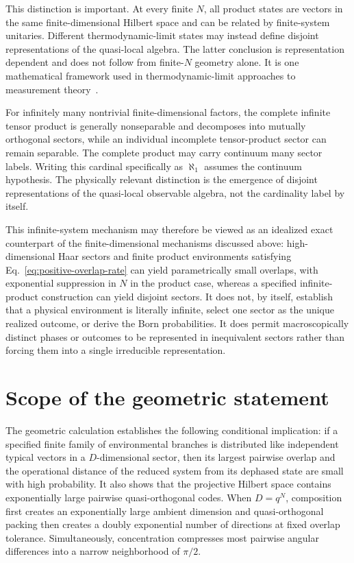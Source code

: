 \documentclass[aps,pra,reprint,superscriptaddress,nofootinbib,longbibliography]{revtex4-2}
\begin{document}
This distinction is important.  At every finite $N$, all product states are
vectors in the same finite-dimensional Hilbert space and can be related by
finite-system unitaries.  Different thermodynamic-limit states may instead
define disjoint representations of the quasi-local algebra.
The latter conclusion is representation dependent and does not follow from
finite-$N$ geometry alone.  It is one mathematical framework used in
thermodynamic-limit approaches to measurement
theory~\cite{hepp-1972,van-den-bossche-2023-a,svozil-2025-u}.

For infinitely many nontrivial finite-dimensional factors, the complete
infinite tensor product is generally nonseparable and decomposes into
mutually orthogonal sectors, while an individual incomplete tensor-product
sector can remain separable.  The complete product may carry continuum many
sector labels.  Writing this cardinal specifically as $\aleph_1$ assumes the
continuum hypothesis.  The physically relevant distinction is the emergence
of disjoint representations of the quasi-local observable algebra, not the
cardinality label by itself.

This infinite-system mechanism may therefore be viewed as an idealized exact
counterpart of the finite-dimensional mechanisms discussed above:
high-dimensional Haar sectors and finite product environments satisfying
Eq.~\eqref{eq:positive-overlap-rate} can yield parametrically small overlaps,
with exponential suppression in $N$ in the product case, whereas a specified
infinite-product construction can yield disjoint sectors.  It does not, by
itself, establish that a physical environment is literally infinite, select
one sector as the unique realized outcome, or derive the Born probabilities.
It does permit macroscopically distinct phases or outcomes to be represented
in inequivalent sectors rather than forcing them into a single irreducible
representation.

\section{Scope of the geometric statement}
\label{sec:scope}

The geometric calculation establishes the following conditional implication:
if a specified finite family of environmental branches is distributed like
independent typical vectors in a $D$-dimensional sector, then its largest
pairwise overlap and the operational distance of the reduced system from its
dephased state are small with high probability.  It also shows that the
projective Hilbert space contains exponentially large pairwise
quasi-orthogonal codes.  When $D=q^N$, composition first creates an
exponentially large ambient dimension and quasi-orthogonal packing then
creates a doubly exponential number of directions at fixed overlap
tolerance.  Simultaneously, concentration compresses most pairwise angular
differences into a narrow neighborhood of $\pi/2$.
\end{document}
